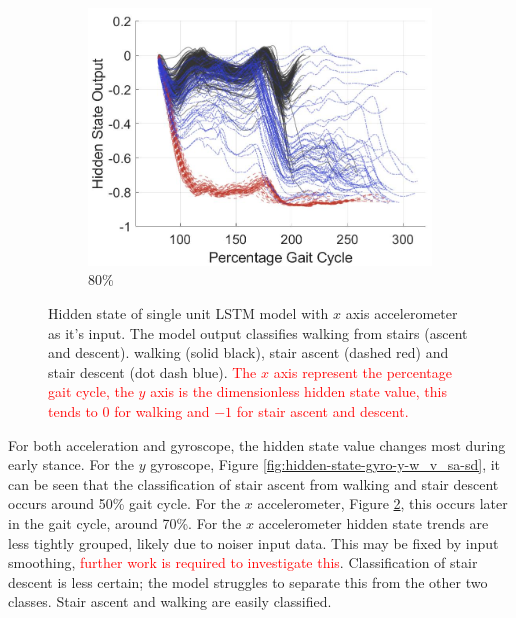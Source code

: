 \documentclass[sensors,article,submit,moreauthors,pdftex]{Definitions/mdpi}
\begin{document}
\begin{figure}[!hbt]
     \begin{subfigure}[b]{0.32\textwidth}
         \centering
         \includegraphics[width=\textwidth]{Figures/results/hidden_state/accel_x_w_v_sa-sd/80_Participant_04.jpg}
         \caption{80\%}
         \label{subfig:e}
     \end{subfigure}
    \caption{Hidden state of single unit LSTM model with $x$ axis accelerometer as it's input. The model output classifies walking from stairs (ascent and descent). walking (solid black), stair ascent (dashed red) and stair descent (dot dash blue). \textcolor{red}{The $x$ axis represent the percentage gait cycle, the $y$ axis is the dimensionless hidden state value, this tends to $0$ for walking and $-1$ for stair ascent and descent.}}
    \label{fig:hidden-state-accel-x-w_v_sa-sd}
\end{figure}

For both acceleration and gyroscope, the hidden state value changes most during early stance. For the $y$ gyroscope, Figure \ref{fig:hidden-state-gyro-y-w_v_sa-sd}, it can be seen that the classification of stair ascent from walking and stair descent occurs around 50\% gait cycle. For the $x$ accelerometer, Figure \ref{fig:hidden-state-accel-x-w_v_sa-sd}, this occurs later in the gait cycle, around 70\%. For the $x$ accelerometer hidden state trends are less tightly grouped, likely due to noiser input data. This may be fixed by input smoothing, \textcolor{red}{further work is required to investigate this}. Classification of stair descent is less certain; the model struggles to separate this from the other two classes. Stair ascent and walking are easily classified.
\end{document}
